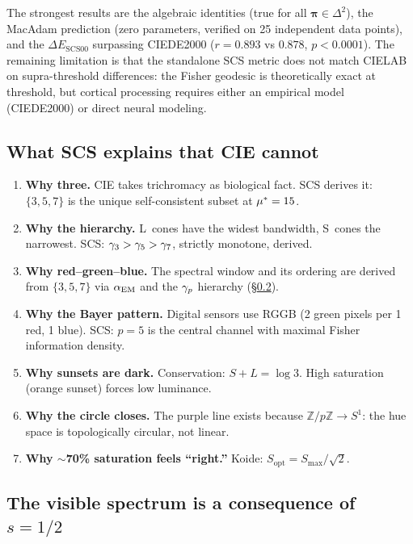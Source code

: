 \documentclass[12pt,a4paper]{article}
\begin{document}
The strongest results are the algebraic identities (true for all
$\bm{\pi} \in \Delta^2$), the MacAdam prediction (zero parameters,
verified on 25 independent data points), and the
$\Delta E_{\mathrm{SCS00}}$ surpassing CIEDE2000 ($r = 0.893$ vs
$0.878$, $p < 0.0001$). The remaining limitation is that the
standalone SCS metric does not match CIELAB on supra-threshold
differences: the Fisher geodesic is theoretically exact at threshold,
but cortical processing requires either an empirical model (CIEDE2000)
or direct neural modeling.

\subsection{What SCS explains that CIE cannot}

\begin{enumerate}[nosep]
\item \textbf{Why three.} CIE takes trichromacy as biological fact.
  SCS derives it: $\{3,5,7\}$ is the unique self-consistent subset
  at ${\mu^{*}} = 15$.
\item \textbf{Why the hierarchy.} L~cones have the widest bandwidth,
  S~cones the narrowest. SCS: $\gamma_{3} > \gamma_{5} > \gamma_{7}$,
  strictly monotone, derived.
\item \textbf{Why red--green--blue.} The spectral window and its
  ordering are derived from $\{3,5,7\}$ via $\alpha_{\mathrm{EM}}$ and the
  $\gamma_{p}$ hierarchy (\S\ref{sec:visible}).
\item \textbf{Why the Bayer pattern.} Digital sensors use RGGB (2 green
  pixels per 1 red, 1 blue). SCS: $p=5$ is the central channel with
  maximal Fisher information density.
\item \textbf{Why sunsets are dark.} Conservation: $S + L = \log 3$.
  High saturation (orange sunset) forces low luminance.
\item \textbf{Why the circle closes.} The purple line exists because
  $\mathbb{Z}/p\mathbb{Z} \to S^1$: the hue space is topologically
  circular, not linear.
\item \textbf{Why $\sim$70\% saturation feels ``right.''} Koide:
  $S_{\text{opt}} = S_{\max}/\sqrt{2}$.
\end{enumerate}

\subsection{The visible spectrum is a consequence of $s = 1/2$}
\label{sec:visible}
\end{document}
